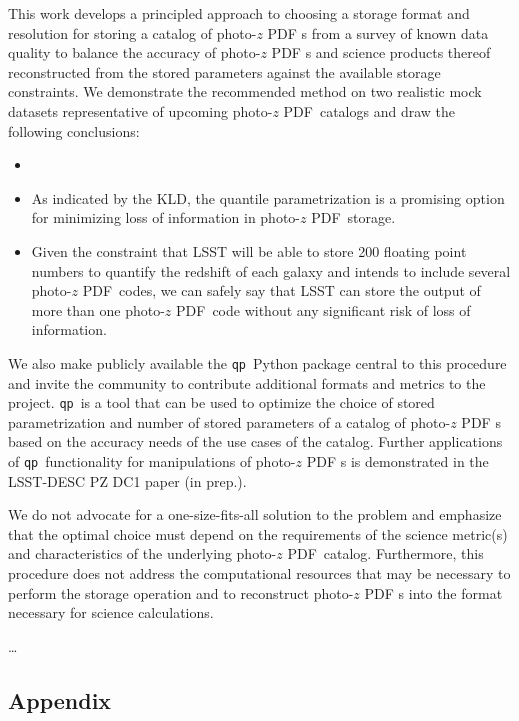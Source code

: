 \documentclass[\docopts]{\docclass}
\newcommand{\qp}{\texttt{qp}\xspace}
\newcommand{\pz}{photo-$z$ PDF\xspace}
\begin{document}
This work develops a principled approach to choosing a storage format and 
resolution for storing a catalog of \pz s from a survey of known data quality 
to balance the accuracy of \pz s and science products thereof reconstructed 
from the stored parameters against the available storage constraints.  We 
demonstrate the recommended method on two realistic mock datasets 
representative of upcoming \pz\ catalogs and draw the following conclusions:
\begin{itemize}
  \item
  \item As indicated by the KLD, the quantile parametrization is a promising 
option for minimizing loss of information in \pz\ storage.
  \item Given the constraint that LSST will be able to store 200 floating point 
numbers to quantify the redshift of each galaxy and intends to include several 
\pz\ codes, we can safely say that LSST can store the output of more than one 
\pz\ code without any significant risk of loss of information.
\end{itemize}

We also make publicly available the \qp\ Python package central to this 
procedure and invite the community to contribute additional formats and metrics 
to the project.  \qp\ is a tool that can be used to optimize the choice of 
stored parametrization and number of stored parameters of a catalog of \pz s 
based on the accuracy needs of the use cases of the catalog.  Further 
applications of \qp\ functionality for manipulations of \pz s is demonstrated 
in the LSST-DESC PZ DC1 paper (in prep.).

We do not advocate for a one-size-fits-all solution to the problem and 
emphasize that the optimal choice must depend on the requirements of the 
science metric(s) and characteristics of the underlying \pz\ catalog.  
Furthermore, this procedure does not address the computational resources that 
may be necessary to perform the storage operation and to reconstruct \pz s into 
the format necessary for science calculations.

\dots


\subsection*{Appendix}
\label{sec:kld}
\end{document}
